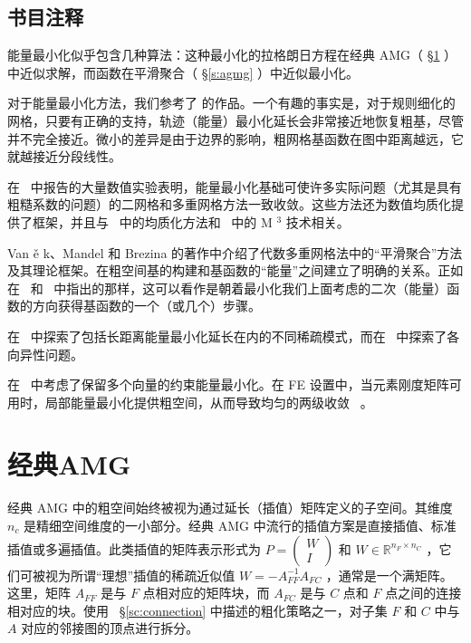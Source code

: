 \documentclass[12pt]{acta_2011xz}
\begin{document}
   \subsection{书目注释  }    能量最小化似乎包含几种算法：这种最小化的拉格朗日方程在经典 AMG（   \S       \ref{s:classical-amg}   ）中近似求解，而函数在平滑聚合（   \S       \ref{s:agmg}   ）中近似最小化。  

对于能量最小化方法，我们参考了    \cite{Mandel.J;Brezina.M;Vanek.P.1999a,Wan.W;Chan.T;Smith.B.1999a,chan1998agglomeration,Xu.J;Zikatanov.L.2004a,Brannick.J;Zikatanov.L.2006b}    的作品。一个有趣的事实是，对于规则细化的网格，只要有正确的支持，轨迹（能量）最小化延长会非常接近地恢复粗基，尽管并不完全接近。微小的差异是由于边界的影响，粗网格基函数在图中距离越远，它就越接近分段线性。  

在~   \cite{Wan.W;Chan.T;Smith.B.1999a,wan1998scalable,Mandel.J;Brezina.M;Vanek.P.1999a,Xu.J;Zikatanov.L.2004a}    中报告的大量数值实验表明，能量最小化基础可使许多实际问题（尤其是具有粗糙系数的问题）的二网格和多重网格方法一致收敛。这些方法还为数值均质化提供了框架，并且与~   \cite{1997GrauschopfT_GriebelM_ReglerH-aa}    中的均质化方法和~   \cite{2011LipnikovK_MoultonJ_SvyatskiyD-aa}    中的 M    $^3$    技术相关。  

Van    \v{e}    k、Mandel 和 Brezina 的著作中介绍了代数多重网格法中的“平滑聚合”方法及其理论框架。在粗空间基的构建和基函数的“能量”之间建立了明确的关系。正如在~    \cite{Wan.W;Chan.T;Smith.B.1999a}    和~    \cite{Mandel.J;Brezina.M;Vanek.P.1999a}    中指出的那样，这可以看作是朝着最小化我们上面考虑的二次（能量）函数的方向获得基函数的一个（或几个）步骤。  

在~    \cite{2011OlsonL_SchroderJ_TuminaroR-aa}    中探索了包括长距离能量最小化延长在内的不同稀疏模式，而在~    \cite{2012SchroderJ-aa}    中探索了各向异性问题。  

在~    \cite{2006VassilevskiP_ZikatanovL-aa}    中考虑了保留多个向量的约束能量最小化。在 FE 设置中，当元素刚度矩阵可用时，局部能量最小化提供粗空间，从而导致均匀的两级收敛~    \cite{2006KolevT_VassilevskiP-aa}    。  


 
   

   \section{经典AMG  }       \label{s:classical-amg}    经典 AMG 中的粗空间始终被视为通过延长（插值）矩阵定义的子空间。其维度    $n_c$    是精细空间维度的一小部分。经典 AMG 中流行的插值方案是直接插值、标准插值或多遍插值。此类插值的矩阵表示形式为    $P=\begin{pmatrix}W \\ I \end{pmatrix}$    和    $W\in \mathbb{R}^{n_F\times n_C}$    ，它们可被视为所谓“理想”插值的稀疏近似值    $W=-A_{FF}^{-1}A_{FC}$    ，通常是一个满矩阵。这里，矩阵    $A_{FF}$    是与    $F$    点相对应的矩阵块，而    $A_{FC}$    是与    $C$    点和    $F$    点之间的连接相对应的块。使用~    \S       \ref{sc:connection}    中描述的粗化策略之一，对子集    $F$    和    $C$    中与    $A$    对应的邻接图的顶点进行拆分。  
\end{document}
